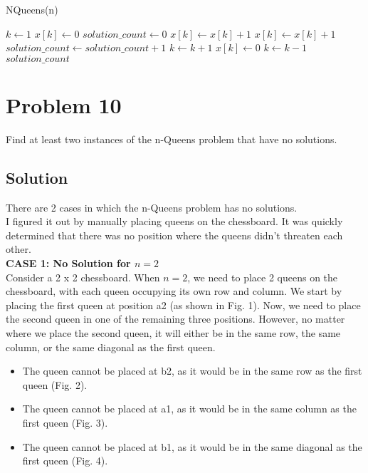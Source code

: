 \documentclass[12pt]{article}
\begin{document}
\begin{algorithm}
    \caption{NQueens(n)}
    \begin{algorithmic}[1]
        \State $k \gets 1$
        \State $x[k] \gets 0$
        \State $solution\_count \gets 0$ 
            \State $x[k] \gets x[k] + 1$
                \State $x[k] \gets x[k] + 1$
            \EndWhile
                    \State $solution\_count \gets solution\_count + 1$ 
                \Else
                    \State $k \gets k + 1$
                    \State $x[k] \gets 0$
                \EndIf
            \Else
                \State $k \gets k - 1$
            \EndIf
        \EndWhile
        \State \Return $solution\_count$ 
    \end{algorithmic}
    \end{algorithm}
\section*{Problem 10}
Find at least two instances of the n-Queens problem that have no solutions.
\subsection*{Solution}
There are 2 cases in which the n-Queens problem has no solutions.\\
I figured it out by manually placing queens on the chessboard. It was quickly determined that there was no position where the queens didn't threaten each other.\\

\textbf{CASE 1: No Solution for $n = 2$} \\[12pt]

Consider a 2 x 2 chessboard. When $n = 2$, we need to place 2 queens on the chessboard, with each queen occupying its own row and column. We start by placing the first queen at position a2 (as shown in Fig. 1). Now, we need to place the second queen in one of the remaining three positions. However, no matter where we place the second queen, it will either be in the same row, the same column, or the same diagonal as the first queen.

\begin{itemize}
    \item The queen cannot be placed at b2, as it would be in the same row as the first queen (Fig. 2).
    \item The queen cannot be placed at a1, as it would be in the same column as the first queen (Fig. 3).
    \item The queen cannot be placed at b1, as it would be in the same diagonal as the first queen (Fig. 4).
\end{itemize}
\end{document}
